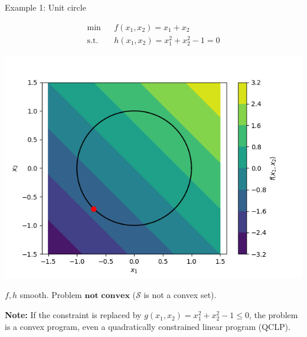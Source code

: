 \documentclass[11pt,compress,t,notes=noshow, xcolor=table]{beamer}
\begin{document}
\begin{vbframe}{Example 1: Unit circle}

\vspace*{-0.5cm} 

\begin{eqnarray*}
  \min && f(x_1, x_2) = x_1 + x_2 \\
  \text{s.t. } && h(x_1,x_2) = x_1^2 + x_2^2 - 1 = 0
\end{eqnarray*}

\begin{center}
  \includegraphics[height=0.3\textwidth, keepaspectratio]{figure_man/unit_circle.png} \\
\end{center}

$f, h$ smooth. Problem $\textbf{not convex}$ ($\mathcal{S}$ is not a convex set). 

\lz 

\begin{footnotesize}
\textbf{Note: } If the constraint is replaced by $g(x_1, x_2) = x_1^2 + x_2^2 - 1 \le 0$, the problem is a convex program, even a quadratically constrained linear program (QCLP). 
\end{footnotesize}

\end{vbframe}
\end{document}
